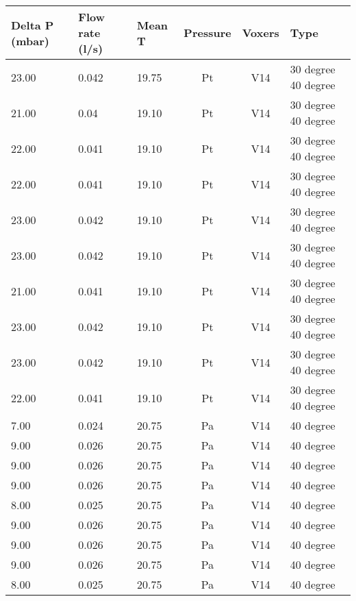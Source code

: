 \begin{table}[t]
\centering
\begin{tabular}{l | l | l | c | c | l}
Delta P (mbar) & Flow rate (l/s) & Mean T & Pressure & Voxers & Type                \\ \hline
23.00          & 0.042           & 19.75  & Pt       & V14    & 30 degree 40 degree \\
21.00          & 0.04            & 19.10  & Pt       & V14    & 30 degree 40 degree \\
22.00          & 0.041           & 19.10  & Pt       & V14    & 30 degree 40 degree \\
22.00          & 0.041           & 19.10  & Pt       & V14    & 30 degree 40 degree \\
23.00          & 0.042           & 19.10  & Pt       & V14    & 30 degree 40 degree \\
23.00          & 0.042           & 19.10  & Pt       & V14    & 30 degree 40 degree \\
21.00          & 0.041           & 19.10  & Pt       & V14    & 30 degree 40 degree \\
23.00          & 0.042           & 19.10  & Pt       & V14    & 30 degree 40 degree \\
23.00          & 0.042           & 19.10  & Pt       & V14    & 30 degree 40 degree \\
22.00          & 0.041           & 19.10  & Pt       & V14    & 30 degree 40 degree \\
7.00           & 0.024           & 20.75  & Pa       & V14    & 40 degree           \\
9.00           & 0.026           & 20.75  & Pa       & V14    & 40 degree           \\
9.00           & 0.026           & 20.75  & Pa       & V14    & 40 degree           \\
9.00           & 0.026           & 20.75  & Pa       & V14    & 40 degree           \\
8.00           & 0.025           & 20.75  & Pa       & V14    & 40 degree           \\
9.00           & 0.026           & 20.75  & Pa       & V14    & 40 degree           \\
9.00           & 0.026           & 20.75  & Pa       & V14    & 40 degree           \\
9.00           & 0.026           & 20.75  & Pa       & V14    & 40 degree           \\
8.00           & 0.025           & 20.75  & Pa       & V14    & 40 degree           \\

\end{tabular}
\end{table}
